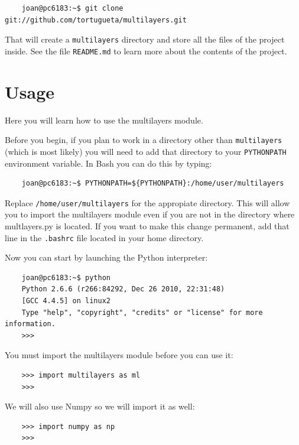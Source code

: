 \documentclass[a4paper,11pt,aps,final]{revtex4}
\begin{document}
\begin{verbatim}
    joan@pc6183:~$ git clone git://github.com/tortugueta/multilayers.git
\end{verbatim}

That will create a \texttt{multilayers} directory and store all the files of the project inside. See the file \texttt{README.md} to learn more about the contents of the project.

\section{Usage}

Here you will learn how to use the \textsf{multilayers} module.

Before you begin, if you plan to work in a directory other than \texttt{multilayers} (which is most likely) you will need to add that directory to your \texttt{PYTHONPATH} environment variable. In \textsf{Bash} you can do this by typing:

\begin{verbatim}
    joan@pc6183:~$ PYTHONPATH=${PYTHONPATH}:/home/user/multilayers
\end{verbatim}

Replace \texttt{/home/user/multilayers} for the appropiate directory. This will allow you to import the \textsf{multilayers} module even if you are not in the directory where \textsf{multlayers.py} is located. If you want to make this change permanent, add that line in the \texttt{.bashrc} file located in your home directory.

Now you can start by launching the \textsf{Python} interpreter:

\begin{verbatim}
    joan@pc6183:~$ python
    Python 2.6.6 (r266:84292, Dec 26 2010, 22:31:48)
    [GCC 4.4.5] on linux2
    Type "help", "copyright", "credits" or "license" for more information.
    >>>
\end{verbatim}

You must import the \textsf{multilayers} module before you can use it:

\begin{verbatim}
    >>> import multilayers as ml
    >>>
\end{verbatim}

We will also use \textsf{Numpy} so we will import it as well:

\begin{verbatim}
    >>> import numpy as np
    >>>
\end{verbatim}
\end{document}

